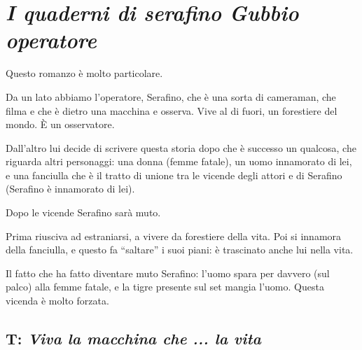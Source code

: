 

\chapter{\textit{I quaderni di serafino Gubbio operatore}}

Questo romanzo è molto particolare.

Da un lato abbiamo l’operatore, Serafino, che è una sorta di cameraman, che filma e che è dietro una macchina e osserva. Vive al di fuori, un forestiere del mondo.
È un osservatore.

Dall’altro lui decide di scrivere questa storia dopo che è successo un qualcosa, che riguarda altri personaggi: una donna (femme fatale), un uomo innamorato di lei, e una fanciulla che è il tratto di unione tra le vicende degli attori e di Serafino (Serafino è innamorato di lei).

Dopo le vicende Serafino sarà muto.

Prima riusciva ad estraniarsi, a vivere da forestiere della vita. Poi si innamora della fanciulla, e questo fa “saltare” i suoi piani: è trascinato anche lui nella vita.

Il fatto che ha fatto diventare muto Serafino: l’uomo spara per davvero (sul palco) alla femme fatale, e la tigre presente sul set mangia l’uomo.
Questa vicenda è molto forzata.

\section{T: \textit{Viva la macchina che ... la vita}}

